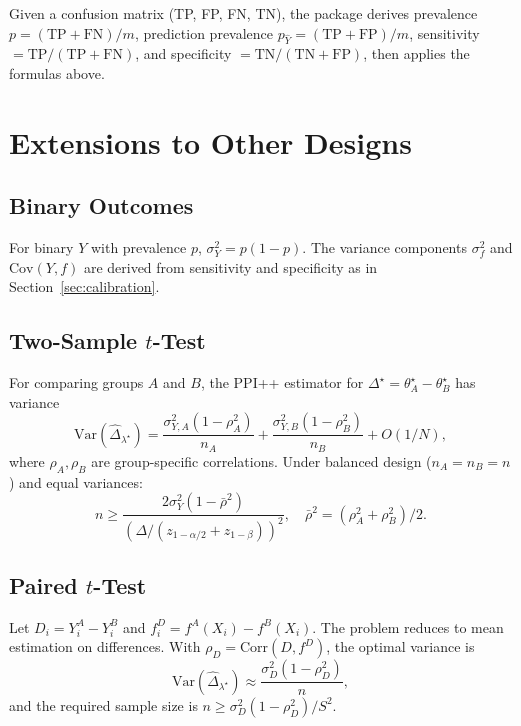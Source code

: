 \documentclass[11pt]{article}
\newcommand{\Var}{\mathrm{Var}}
\newcommand{\Cov}{\mathrm{Cov}}
\newcommand{\Corr}{\mathrm{Corr}}
\newcommand{\wh}{\widehat}
\begin{document}
Given a confusion matrix (TP, FP, FN, TN), the package derives
prevalence $p = (\text{TP}+\text{FN})/m$, prediction prevalence
$p_{\hat Y} = (\text{TP}+\text{FP})/m$, sensitivity
$= \text{TP}/(\text{TP}+\text{FN})$, and specificity
$= \text{TN}/(\text{TN}+\text{FP})$, then applies the formulas above.

\section{Extensions to Other Designs}
\label{sec:extensions}

\subsection{Binary Outcomes}
\label{sec:binary}

For binary $Y$ with prevalence $p$, $\sigma_Y^2 = p(1-p)$.  The
variance components $\sigma_f^2$ and $\Cov(Y,f)$ are derived from
sensitivity and specificity as in Section~\ref{sec:calibration}.

\subsection{Two-Sample $t$-Test}
\label{sec:ttest}

For comparing groups $A$ and $B$, the PPI++ estimator for
$\Delta^\star = \theta_A^\star - \theta_B^\star$ has variance
\begin{equation}\label{eq:ppi++-ttest-var}
\Var(\wh\Delta_{\lambda^\star}) =
  \frac{\sigma_{Y,A}^2(1-\rho_A^2)}{n_A} +
  \frac{\sigma_{Y,B}^2(1-\rho_B^2)}{n_B} + O(1/N),
\end{equation}
where $\rho_A,\rho_B$ are group-specific correlations.  Under balanced
design ($n_A=n_B=n$) and equal variances:
\begin{equation}\label{eq:ppi++-ttest-n}
n \ge \frac{2\sigma_Y^2(1 - \bar\rho^2)}
  {(\Delta/(z_{1-\alpha/2}+z_{1-\beta}))^2},
\quad \bar\rho^2 = (\rho_A^2+\rho_B^2)/2.
\end{equation}

\subsection{Paired $t$-Test}
\label{sec:paired}

Let $D_i = Y_i^A - Y_i^B$ and
$f_i^D = f^A(X_i) - f^B(X_i)$.  The problem reduces to mean
estimation on differences.  With
$\rho_D = \Corr(D, f^D)$, the optimal variance is
\begin{equation}\label{eq:ppi++-paired-var}
\Var(\wh\Delta_{\lambda^\star}) \approx
  \frac{\sigma_D^2(1-\rho_D^2)}{n},
\end{equation}
and the required sample size is
$n \ge \sigma_D^2(1-\rho_D^2) / S^2$.
\end{document}
